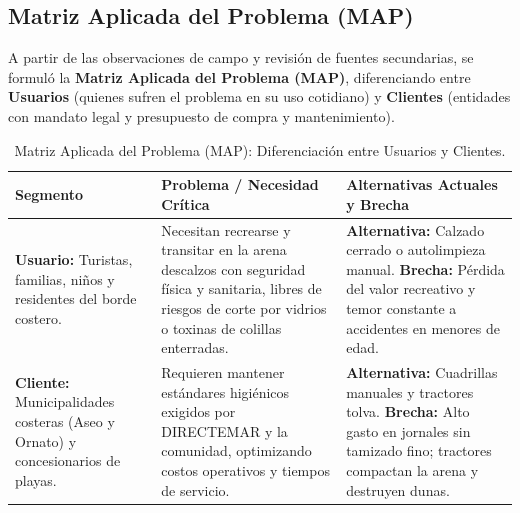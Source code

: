 \documentclass[12pt,letterpaper]{article}
\begin{document}
\subsection{Matriz Aplicada del Problema (MAP)}
A partir de las observaciones de campo y revisión de fuentes secundarias, se formuló la \textbf{Matriz Aplicada del Problema (MAP)}, diferenciando entre \textbf{Usuarios} (quienes sufren el problema en su uso cotidiano) y \textbf{Clientes} (entidades con mandato legal y presupuesto de compra y mantenimiento).

\begin{table}[h!]
\centering
\footnotesize
{}
\begin{tabularx}{\textwidth}{p{3.2cm}X p{5.5cm}}
\toprule
\textbf{Segmento} & \textbf{Problema / Necesidad Crítica} & \textbf{Alternativas Actuales y Brecha} \\
\midrule
\textbf{Usuario:} Turistas, familias, niños y residentes del borde costero. & 
Necesitan recrearse y transitar en la arena descalzos con seguridad física y sanitaria, libres de riesgos de corte por vidrios o toxinas de colillas enterradas. & 
\textbf{Alternativa:} Calzado cerrado o autolimpieza manual.\newline 
\textbf{Brecha:} Pérdida del valor recreativo y temor constante a accidentes en menores de edad. \\
\addlinespace[2pt]
\textbf{Cliente:} Municipalidades costeras (Aseo y Ornato) y concesionarios de playas. & 
Requieren mantener estándares higiénicos exigidos por DIRECTEMAR y la comunidad, optimizando costos operativos y tiempos de servicio. & 
\textbf{Alternativa:} Cuadrillas manuales y tractores tolva.\newline 
\textbf{Brecha:} Alto gasto en jornales sin tamizado fino; tractores compactan la arena y destruyen dunas. \\
\bottomrule
\end{tabularx}
\caption{Matriz Aplicada del Problema (MAP): Diferenciación entre Usuarios y Clientes.}
\label{tab:map}
\end{table}
\end{document}
